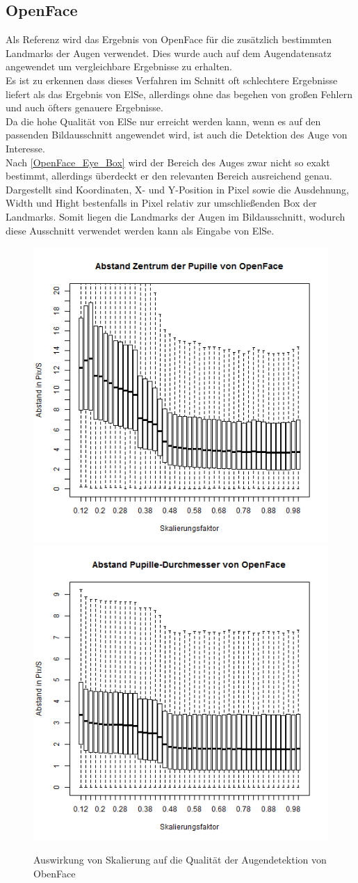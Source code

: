 \subsection{OpenFace}
Als Referenz wird das Ergebnis von OpenFace für die zusätzlich bestimmten Landmarks der Augen verwendet. Dies wurde auch auf dem Augendatensatz \cite{database_Eye} angewendet um vergleichbare Ergebnisse zu erhalten.\\
Es ist zu erkennen dass dieses Verfahren im Schnitt oft schlechtere Ergebnisse liefert als das Ergebnis von ElSe, allerdings ohne das begehen von großen Fehlern und auch öfters genauere Ergebnisse.\\
Da die hohe Qualität von ElSe nur erreicht werden kann, wenn es auf den passenden Bildausschnitt angewendet wird, ist auch die Detektion des Auge von Interesse.\\
Nach \autoref{OpenFace_Eye_Box} wird der Bereich des Auges zwar nicht so exakt bestimmt, allerdings überdeckt er den relevanten Bereich ausreichend genau. Dargestellt sind Koordinaten, X- und Y-Position in Pixel sowie die Ausdehnung, Width und Hight bestenfalls in Pixel relativ zur umschließenden Box der Landmarks. Somit liegen die Landmarks der Augen im Bildausschnitt, wodurch diese Ausschnitt verwendet werden kann als Eingabe von ElSe.
\begin{figure}
	\centering
	\includegraphics[width=0.45\linewidth]{Eye_Img_Box/Openface_PC}
	\includegraphics[width=0.45\linewidth]{Eye_Img_Box/Openface_PW}
	\caption{Auswirkung von Skalierung auf die Qualität der Augendetektion von ObenFace}
	\label{OpenFace_Eye}
\end{figure}
